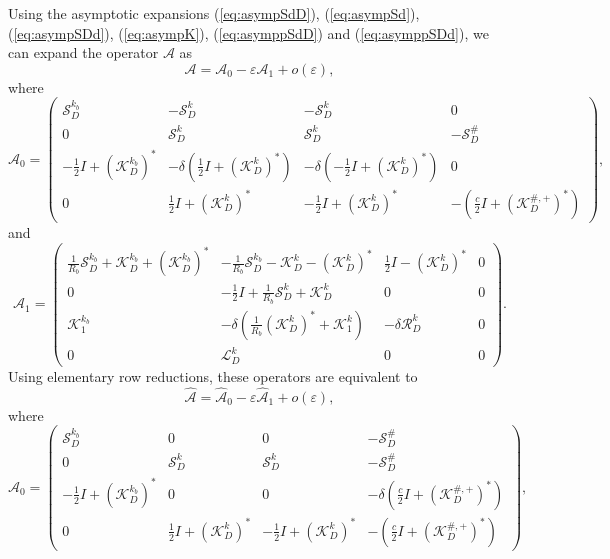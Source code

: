 \documentclass[a4paper]{article}
\theoremstyle{definition}
\newcommand{\A}{\mathcal{A}}
\renewcommand{\L}{\mathcal{L}}
\renewcommand{\S}{\mathcal{S}}
\newcommand{\K}{\mathcal{K}}
\renewcommand{\epsilon}{\varepsilon}
\newcommand{\Scrystal}{\mathcal{S}_D^\#}
\newcommand{\eqnref}[1]{(\ref {#1})}
\begin{document}
Using the asymptotic expansions \eqnref{eq:asympSdD}, \eqnref{eq:asympSd}, \eqnref{eq:asympSDd}, \eqnref{eq:asympK}, \eqnref{eq:asymppSdD} and \eqnref{eq:asymppSDd}, we can expand the operator $\A$ as 
\begin{equation}
\A = \A_0 - \epsilon \A_1 + o(\epsilon),
\end{equation}
where
\begin{equation} \label{eq:A0}
\A_0 = 
\begin{pmatrix}
\S_{D}^{k_b} &  -\S_{D}^{k} & -\S_{D}^{k} & 0 \\
0 & \S_{D}^k & \S_{D}^k & -\Scrystal \\
-\frac{1}{2}I+ (\K_{D}^{k_b})^*& -\delta\left( \frac{1}{2}I+ (\K_{D}^{k})^*\right) & -\delta\left( -\frac{1}{2}I+ (\K_{D}^{k})^*\right) & 0 \\
0 & \frac{1}{2}I+ (\K_D^{k})^* & -\frac{1}{2}I+ (\K_D^{k})^* & -\left( \frac{c}{2}I+ \left(\K_D^{\#,+}\right)^*\right)
\end{pmatrix}, 
\end{equation}
and
\begin{equation} \label{eq:A1}
\A_1 = 
\begin{pmatrix}
\frac{1}{R_b}\S_D^{k_b} + \K_D^{k_b} + \left(\K_D^{k_b}\right)^* &  -\frac{1}{R_b}\S_D^{k_b} - \K_D^{k} - \left(\K_D^{k}\right)^* & \frac{1}{2}I - \left(\K_D^k\right)^* & 0 \\
0 & -\frac{1}{2}I+ \frac{1}{R_b}\S_D^k + \K_D^k  & 0 & 0 \\
\K_1^{k_b}& -\delta\left(\frac{1}{R_b}\left(\K_D^k\right)^* + \K_1^k\right) & -\delta \mathcal{R}_D^k  & 0 \\
0 & \L_D^k & 0 & 0
\end{pmatrix}.
\end{equation}
Using elementary row reductions, these operators are equivalent to 
\begin{equation}
\hat{\A} = \hat{\A}_0 - \epsilon \hat{\A}_1 + o(\epsilon),
\end{equation}
where
\begin{equation} \label{eq:Ahat0}
\hat{\A}_0 = 
\begin{pmatrix}
\S_{D}^{k_b} &  0 & 0 & -\Scrystal \\
0 & \S_{D}^k & \S_{D}^k & -\Scrystal \\
-\frac{1}{2}I+ (\K_{D}^{k_b})^* & 0 & 0 & -\delta\left( \frac{c}{2}I+ \left(\K_D^{\#,+}\right)^*\right)\\
0 & \frac{1}{2}I+ (\K_D^{k})^* & -\frac{1}{2}I+ (\K_D^{k})^* & -\left( \frac{c}{2}I+ \left(\K_D^{\#,+}\right)^*\right)
\end{pmatrix}, 
\end{equation}
\end{document}

